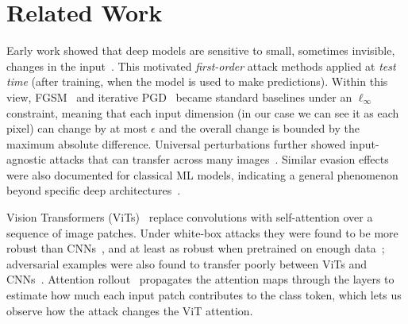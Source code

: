\documentclass{article}
\begin{document}
\section{Related Work}\label{sec:relatedwork}
Early work showed that deep models are sensitive to small, sometimes invisible, changes in the input~\cite{szegedy2014intriguingpropertiesneuralnetworks}. This motivated \textit{first-order} attack methods applied at \emph{test time} (after training, when the model is used to make predictions). Within this view, FGSM~\cite{goodfellow2015explainingharnessingadversarialexamples} and iterative PGD~\cite{madry2019deeplearningmodelsresistant} became standard baselines under an \(\ell_\infty\) constraint, meaning that each input dimension (in our case we can see it as each pixel) can change by at most \(\epsilon\) and the overall change is bounded by the maximum absolute difference. Universal perturbations further showed input-agnostic attacks that can transfer across many images~\cite{moosavidezfooli2017universaladversarialperturbations}. Similar evasion effects were also documented for classical ML models, indicating a general phenomenon beyond specific deep architectures~\cite{Biggio_2013}.

Vision Transformers (ViTs)~\cite{dosovitskiy2021imageworth16x16words} replace convolutions with self-attention over a sequence of image patches. Under white-box attacks they were found to be more robust than CNNs~\cite{shao2022adversarialrobustnessvisiontransformers}, and at least as robust when pretrained on enough data~\cite{bhojanapalli2021understandingrobustnesstransformersimage}; adversarial examples were also found to transfer poorly between ViTs and CNNs~\cite{mahmood2021robustnessvisiontransformersadversarial}. Attention rollout~\cite{abnar2020quantifyingattentionflowtransformers} propagates the attention maps through the layers to estimate how much each input patch contributes to the class token, which lets us observe how the attack changes the ViT attention.
\end{document}
